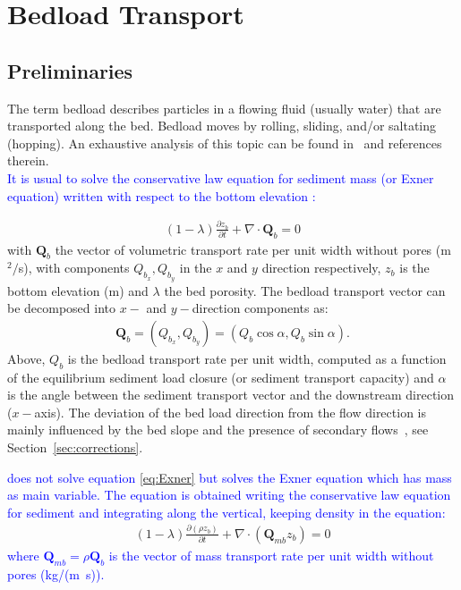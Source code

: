 \chapter[Bedload sediment transport]{Bedload Transport}\label{sec:BedloadTransport}

\section{Preliminaries}
The term bedload describes particles in a flowing fluid (usually water) that are transported along the bed. Bedload moves by rolling, sliding, and/or saltating (hopping). An exhaustive analysis of this topic can be found in~\cite{GarciaBook2006} and references therein.\\

\textcolor{blue}{It is usual to solve the conservative law equation for sediment mass (or Exner equation) written with respect to the bottom elevation :}

\begin{align}
(1-\lambda)\frac{\partial z_b}{\partial t} + \nabla\cdot \mathbf Q_b = 0
\label{eq:Exner}
\end{align}
with $\mathbf Q_b$ the vector of volumetric transport rate per unit width without pores (m$^2/$s), with components $Q_{b_x}, Q_{b_y}$ in the $x$ and $y$ direction respectively, $z_b$ is the bottom elevation (m) and $\lambda$ the bed porosity. The bedload transport vector can be decomposed into $x-$ and $y-$direction components as:
\begin{align}
\mathbf Q_b = (Q_{b_x}, Q_{b_y}) = (Q_b \cos\alpha, Q_b \sin\alpha).
\label{eq:bedloadtransportvector}
\end{align}
Above, $Q_b$ is the bedload transport rate per unit width, computed as a function of the equilibrium sediment load closure (or sediment transport capacity) and $\alpha$ is the angle between the sediment transport vector and the downstream direction ($x-$axis).
The deviation of the bed load direction from the flow direction is mainly influenced by the bed slope and the presence of secondary flows~\cite{Talmon95}, see Section~\ref{sec:corrections}.

\textcolor{blue}{\gaia{} does not solve equation \eqref{eq:Exner} but solves the Exner equation which has mass as main variable. The equation is obtained writing the conservative law equation for sediment and integrating along the vertical, keeping density in the equation:}
\begin{align}
(1-\lambda)\frac{\partial \left(\rho z_b\right)}{\partial t} + \nabla\cdot \left(\mathbf Q_{mb} z_b\right) = 0
\label{eq:Exner_mass}
\end{align}
\textcolor{blue}{where $\mathbf Q_{mb}=\rho \mathbf Q_b$ is the vector of mass transport rate per unit width without pores (kg/(m~s)).}

